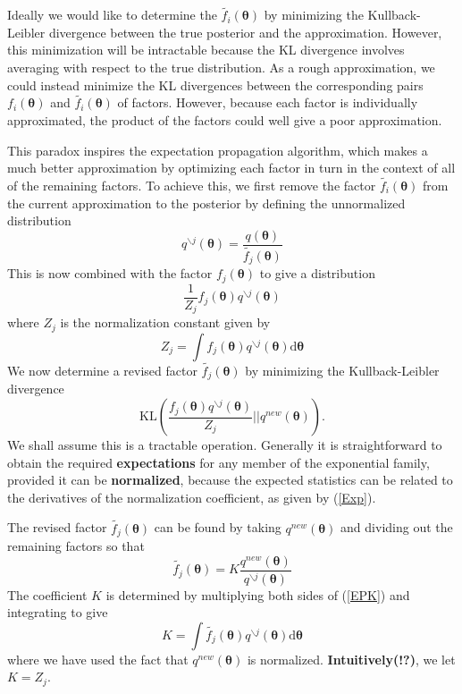 \documentclass[a4paper]{book}
\newcommand{\ud}{\mathrm{d}}
\newcommand{\up}{\mathrm}
\renewcommand{\bf}{\mathbf}
\newcommand{\bs}{\boldsymbol}
\begin{document}
Ideally we would like to determine the $\tilde{f_i}(\bs{\theta})$ by minimizing the Kullback-Leibler divergence between the true posterior and the approximation. However, this minimization will be intractable because the KL divergence involves averaging with respect to the true distribution. As a rough approximation, we could instead minimize the KL divergences between the corresponding pairs $f_i(\bs{\theta})$ and $\tilde{f_i}(\bs{\theta})$ of factors. However, because each factor is individually approximated, the product of the factors could well give a poor approximation.

This paradox inspires the expectation propagation algorithm, which makes a much better approximation by optimizing each factor in turn in the context of all of the remaining factors. To achieve this, we first remove the factor $\tilde{f_i}(\bs{\theta})$ from the current approximation to the posterior by defining the unnormalized distribution
\begin{equation}
	q^{\backslash j}(\bs{\theta}) = \frac{q(\bs{\theta})}{\tilde{f_j}(\bs{\theta})}
\end{equation}
This is now combined with the factor $f_j(\bs{\theta})$ to give a distribution
\begin{equation}
	\frac{1}{Z_j} f_j(\bs{\theta})q^{\backslash j}(\bs{\theta})
\end{equation}
where $Z_j$ is the normalization constant given by
\begin{equation}
	Z_j = \int f_j(\bs{\theta}) q^{\backslash j}(\bs{\theta}) \ud \bs{\theta}
\end{equation}
We now determine a revised factor $\tilde{f_j}(\bs{\theta})$ by minimizing the Kullback-Leibler divergence
\begin{equation}
	\up{KL}\left( \frac{f_j(\bs{\theta})q^{\backslash j}(\bs{\theta})}{Z_j} \bigg| \bigg| q^{new}(\bs{\theta}) \right).
\end{equation}
We shall assume this is a tractable operation. Generally it is straightforward to obtain the required \textbf{expectations} for any member of the exponential family, provided it can be \textbf{normalized}, because the expected statistics can be related to the derivatives of the normalization coefficient, as given by (\ref{Exp}).

The revised factor $\tilde{f_j}(\bs{\theta})$ can be found by taking $q^{new}(\bf{\theta})$ and dividing out the remaining factors so that
\begin{equation}
	\tilde{f_j}(\bs{\theta}) = K \frac{q^{new}(\bs{\theta})}{q^{\backslash j}(\bs{\theta})} \label{EPK}
\end{equation}
The coefficient $K$ is determined by multiplying both sides of (\ref{EPK}) and integrating to give
\begin{equation}
	K = \int \tilde{f_j}(\bs{\theta}) q^{\backslash j}(\bs{\theta}) \ud \bs{\theta}
\end{equation}
where we have used the fact that $q^{new}(\bs{\theta})$ is normalized. \textbf{Intuitively(!?)}, we let $K = Z_j$.
\end{document}
